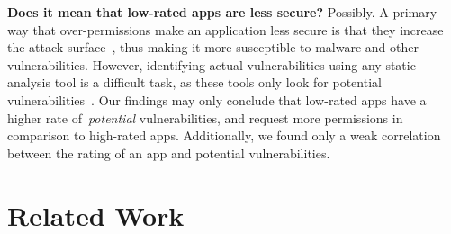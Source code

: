 \documentclass{sig-alternate-05-2015}
\newcommand{\todo}[1]{\textcolor{cyan}{\textbf{[#1]}}}
\begin{document}


\textbf{Does it mean that low-rated apps are less secure?} Possibly.
A primary way that over-permissions make an application less secure is that they increase the attack surface~\cite{5482589, Felt:2011:APD:2046707.2046779}, thus making it more susceptible to malware and other vulnerabilities. However, identifying actual vulnerabilities using any static analysis tool is a difficult task, as these tools only look for potential vulnerabilities~\cite{chess2004static}. Our findings may only conclude that low-rated apps have a higher rate of~\emph{potential} vulnerabilities, and request more permissions in comparison to high-rated apps. Additionally, we found only a weak correlation between the rating of an app and potential vulnerabilities.














\section{Related Work}
\label{sec:relatedwork}
\end{document}
